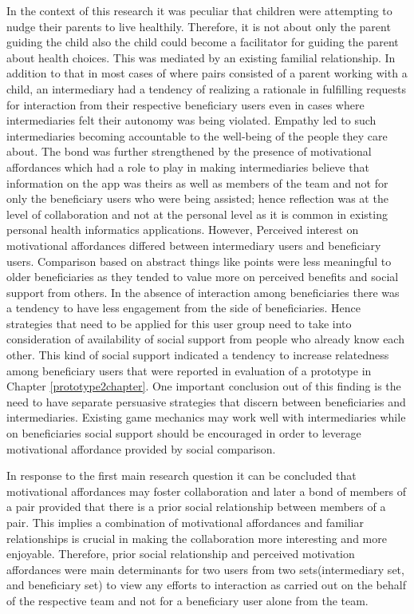 In the context of this research it was peculiar that children were attempting to nudge their parents to live healthily. Therefore, it is not about only the parent guiding the child also the child could become a facilitator for guiding the parent about health choices. This was mediated by an existing familial relationship. In addition to that in most cases of where pairs consisted of a parent working with a child, an intermediary had a tendency of realizing a rationale in fulfilling  requests for interaction from their respective beneficiary users even in cases where intermediaries felt their autonomy was being violated. Empathy led to such intermediaries becoming accountable to the well-being of the people they care about. The bond was further strengthened by the presence of motivational affordances which had a role to play in making intermediaries believe that information on the app was theirs as well as members of the team and not for only the beneficiary users who were being assisted; hence reflection was at the level of collaboration and not at the personal level as it is common in existing personal health informatics applications.  However, Perceived interest on motivational affordances differed between intermediary users and beneficiary users. Comparison based on abstract things like points were less meaningful to older beneficiaries as they tended to value more on perceived benefits and social support from others. In the absence of interaction among beneficiaries there was a tendency to have less engagement from the side of beneficiaries. Hence strategies that need to be applied for this user group need to take into consideration of availability of social support from people who already know each other. This kind of social support indicated a tendency to increase relatedness among beneficiary users that were reported in evaluation of a prototype in Chapter \ref{prototype2chapter}. One important conclusion out of this finding is the need to have separate persuasive strategies that discern between beneficiaries and intermediaries. Existing game mechanics may work well with intermediaries while on beneficiaries social support should be encouraged in order to leverage motivational affordance provided by social comparison.

In response to the first main research question it can be concluded that motivational affordances may foster collaboration and later a bond of members of a pair provided that there is a prior social relationship between members of a pair. This implies a combination of motivational affordances and familiar relationships is crucial in making the collaboration more interesting and more enjoyable. Therefore, prior social relationship and perceived motivation affordances were main determinants for two users from two sets(intermediary set, and beneficiary set) to view any efforts to interaction as carried out on the behalf of the respective team and not for a beneficiary user alone from the team.  

